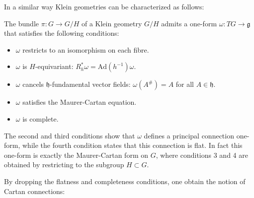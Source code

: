     In a similar way Klein geometries can be characterized as follows:
    \begin{property}
        The bundle $\pi:G\rightarrow G/H$ of a Klein geometry $G/H$ admits a one-form $\omega:TG\rightarrow\mathfrak{g}$ that satisfies the following conditions:
        \begin{itemize}
            \item $\omega$ restricts to an isomorphism on each fibre.
            \item $\omega$ is $H$-equivariant: $R_h^*\omega = \mathrm{Ad}(h^{-1})\omega$.
            \item $\omega$ cancels $\mathfrak{h}$-fundamental vector fields: $\omega(A^\#)=A$ for all $A\in\mathfrak{h}$.
            \item $\omega$ satisfies the Maurer-Cartan equation.
            \item $\omega$ is complete.
        \end{itemize}
    \end{property}
    The second and third conditions show that $\omega$ defines a principal connection one-form, while the fourth condition states that this connection is flat. In fact this one-form is exactly the Maurer-Cartan form on $G$, where conditions 3 and 4 are obtained by restricting to the subgroup $H\subset G$.

    By dropping the flatness and completeness conditions, one obtain the notion of Cartan connections:


